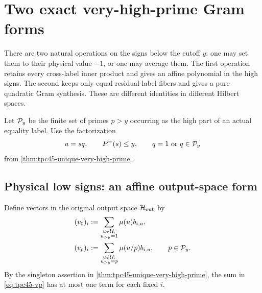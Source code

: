 \section{Two exact very-high-prime Gram forms}
\label{sec:tpc45-affine-gram}

There are two natural operations on the signs below the cutoff \(y\):
one may set them to their physical value \(-1\), or one may average
them.  The first operation retains every cross-label inner product and
gives an affine polynomial in the high signs.  The second keeps only
equal residual-label fibers and gives a pure quadratic Gram synthesis.
These are different identities in different Hilbert spaces.

Let \(\mathcal P_y\) be the finite set of primes \(p>y\) occurring as the high
part of an actual equality label.  Use the factorization
\begin{equation}
 u=sq,
 \qquad P^{+}(s)\le y,
 \qquad q=1\ \text{or}\ q\in\mathcal P_y
 \label{eq:tpc45-u-sq}
\end{equation}
from \cref{thm:tpc45-unique-very-high-prime}.

\subsection{Physical low signs: an affine output-space form}

Define vectors in the original output space \(\mathcal H_{\rm out}\) by
\begin{align}
 (v_0)_i
 &:=\sum_{\substack{u\in\mathcal U_i\\u_{>y}=1}}
     \mu(u)b_{i,u},
 \label{eq:tpc45-v0}\\
 (v_p)_i
 &:=\sum_{\substack{u\in\mathcal U_i\\u_{>y}=p}}
     \mu(u/p)b_{i,u},
 \qquad p\in\mathcal P_y.
 \label{eq:tpc45-vp}
\end{align}
By the singleton assertion in
\cref{thm:tpc45-unique-very-high-prime}, the sum in
\eqref{eq:tpc45-vp} has at most one term for each fixed \(i\).


